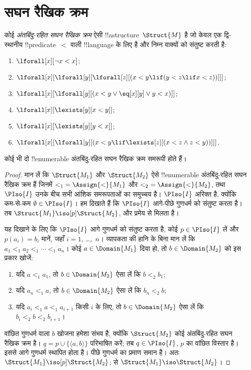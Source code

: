 \documentclass[../../../include/open-logic-section]{subfiles}
\begin{document}
\section{सघन रैखिक क्रम}

\begin{defn}
  कोई \emph{अंतबिंदु-रहित सघन रैखिक क्रम} ऐसी !!a{structure}~$\Struct{M}$
  है जो केवल एक द्वि-स्थानीय !!{predicate}~$<$ वाली !!{language} के लिए है
  और निम्न वाक्यों को संतुष्ट करती है:
  \begin{enumerate}
  \item $\lforall[x][\lnot x < x]$;
  \item $\lforall[x][\lforall[y][\lforall[z][(x < y \lif (y < z \lif x
    <z ))]]]$;
  \item $\lforall[x][\lforall[y][(x< y \lor \eq[x][y] \lor y < x)]]$;
  \item $\lforall[x][\lexists[y][x < y]]$;
  \item $\lforall[x][\lexists[y][y < x]]$;
  \item $\lforall[x][\lforall[y][(x < y \lif \lexists[z][(x < z \land
        z < y))]]]$.
 \end{enumerate}
\end{defn}

\begin{thm}
  कोई भी दो !!{enumerable} अंतबिंदु-रहित सघन रैखिक क्रम समरूपी होते हैं।
\end{thm}

\begin{proof}
  मान लें कि $\Struct{M_1}$ और $\Struct{M_2}$ ऐसे !!{enumerable}
  अंतबिंदु-रहित सघन रैखिक क्रम हैं जिनमें ${<_1} = \Assign{<}{M_1}$ और ${<_2} =
  \Assign{<}{M_2}$, तथा $\PIso{I}$ उनके बीच सभी आंशिक समरूपताओं का समुच्चय
  है। $\PIso{I}$ अरिक्त है, क्योंकि कम-से-कम $\emptyset \in \PIso{I}$। हम
  दिखाते हैं कि $\PIso{I}$ आगे-पीछे गुणधर्म को संतुष्ट करता
  है। तब $\Struct{M_1} \iso[p] \Struct{M_2}$, और प्रमेय
   से मिलता है।

  यह दिखाने के लिए कि $\PIso{I}$ आगे गुणधर्म को संतुष्ट करता है, कोई $p \in
  \PIso{I}$ लें और $p(a_i) = b_i$ मानें, जहाँ $i = 1$, \dots,~$n$।
  व्यापकता की हानि के बिना मान लें कि $a_1 <_1 a_2 <_1 \cdots <_1
  a_n$।
  कोई $a \in \Domain{M_1}$ दिया हो, तो $b \in \Domain{M_2}$ को इस प्रकार
  खोजें:
  \begin{enumerate}
  \item यदि $a <_1 a_1$, तो $b \in \Domain{M_2}$ ऐसा लें कि $b <_2
    b_1$;
  \item यदि $a_n <_1 a$, तो $b \in \Domain{M_2}$ ऐसा लें कि $b_n <_2 b$;
 \item यदि $a_i <_1 a <_1 a_{i+1}$ किसी $i$ के लिए, तो $b \in
   \Domain{M_2}$ ऐसा लें कि $b_i <_2 b <_2 b_{i+1}$।
  \end{enumerate}
  वांछित गुणधर्म वाला $b$ खोजना हमेशा संभव है, क्योंकि $\Struct{M_2}$ कोई
  अंतबिंदु-रहित सघन रैखिक क्रम है। $q = p \cup \{ \langle a, b \rangle \}$
  परिभाषित करें; तब $q \in \PIso{I}$, $p$ का वांछित विस्तार है। इससे
  आगे गुणधर्म स्थापित होता है। पीछे गुणधर्म का प्रमाण समान है। अतः
  $\Struct{M_1} \iso[p]
  \Struct{M_2}$;  से $\Struct{M_1} \iso
  \Struct{M_2}$।
\end{proof}
\end{document}
